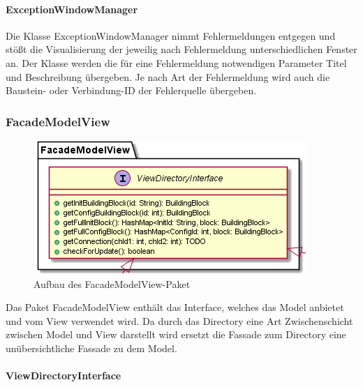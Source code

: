 \documentclass[parskip=full]{scrartcl}
\begin{document}
\paragraph{ExceptionWindowManager}

Die Klasse ExceptionWindowManager nimmt Fehlermeldungen entgegen und stößt die Visualisierung der jeweilig nach Fehlermeldung unterschiedlichen Fenster an. Der Klasse werden die für eine Fehlermeldung notwendigen Parameter Titel und  Beschreibung übergeben. Je nach Art der Fehlermeldung wird auch die Baustein- oder Verbindung-ID der Fehlerquelle übergeben.

\subsubsection {FacadeModelView}

\begin{figure}[htbp]
	\begin{center}
		\includegraphics[width = 12 cm]{Grafiken/View/FacadeModelViewNamespace.PNG}
		\caption{Aufbau des FacadeModelView-Paket}
		\label{Entwurf_Grob}
	\end{center}
\end{figure}

Das Paket FacadeModelView enthält das Interface, welches das Model anbietet und vom View verwendet wird. Da durch das Directory eine Art Zwischenschicht zwischen Model und View darstellt wird ersetzt die Fassade zum Directory eine unübersichtliche Fassade zu dem Model. 

\paragraph{ViewDirectoryInterface}
\end{document}

